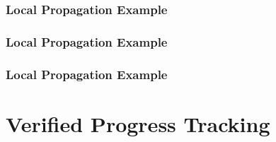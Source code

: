 \documentclass[aspectratio=169,10pt]{beamer}
\begin{document}
\begin{frame}
  \frametitle{Local Propagation Example}
  \begin{center}
    
  \end{center}
\end{frame}

\begin{frame}
  \frametitle{Local Propagation Example}
  \begin{center}
    
  \end{center}
\end{frame}

\begin{frame}
  \frametitle{Local Propagation Example}
  \begin{center}
    
  \end{center}
\end{frame}

\section{Verified Progress Tracking}
\end{document}
